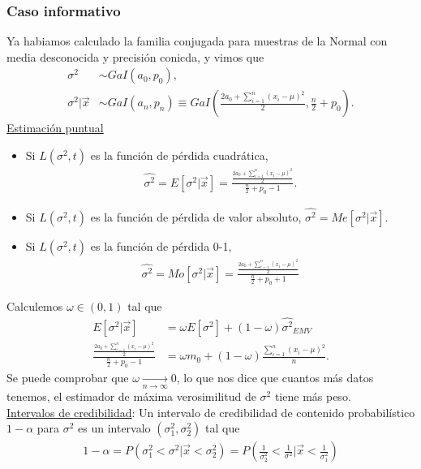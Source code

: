 \subsubsection{Caso informativo}
\noindent Ya habiamos calculado la familia conjugada para muestras de la Normal con media desconocida y precisión conicda, y vimos que
\begin{align*}
    \sigma^2 &\sim GaI(a_0,p_0), \\
    \sigma^2 | \vec{x} &\sim GaI(a_n,p_n) \equiv GaI\left(\frac{2a_0 + \sum_{i=1}^{n} (x_i- \mu)^2}{2}, \frac{n}{2} + p_0 \right).
\end{align*}
\noindent \underline{Estimación puntual}
\begin{itemize}
    \item Si $L(\sigma^2,t)$ es la función de pérdida cuadrática, 
    \begin{align*}
        \widehat{\sigma^2} = E[\sigma^2 |  \vec{x}] = \frac{\frac{2a_0 + \sum_{i=1}^{n} (x_i- \mu)^2}{2}}{\frac{n}{2} + p_0-1}.
    \end{align*}
    \item Si $L(\sigma^2,t)$ es la función de pérdida de valor absoluto, $\widehat{\sigma^2} = Me[\sigma^2 |  \vec{x}]$.
    \item Si $L(\sigma^2,t)$ es la función de pérdida 0-1,
    \begin{align*}
        \widehat{\sigma^2} = Mo[\sigma^2 |  \vec{x}] =  \frac{\frac{2a_0 + \sum_{i=1}^{n} (x_i- \mu)^2}{2}}{\frac{n}{2} + p_0+1}
    \end{align*}
\end{itemize}
Calculemos $\omega \in (0,1)$ tal que 
\begin{align*}
    E[\sigma^2  | \vec{x}] &= \omega E[\sigma^2]  + (1 - \omega) \widehat{\sigma^2 }_{EMV}  \\
   \frac{\frac{2a_0 + \sum_{i=1}^{n} (x_i- \mu)^2}{2}}{\frac{n}{2} + p_0-1} &= \omega m_0 + (1-\omega) \frac{\sum_{i=1}^{n}{(x_i -\mu)^2}}{n}.
\end{align*}
Se puede comprobar que $\omega \xrightarrow[n \to \infty]{} 0$, lo que nos dice que cuantos más datos tenemos, el estimador de máxima verosimilitud de $\sigma^2$ tiene más peso.
\\
\newline
\noindent \underline{Intervalos de credibilidad}: Un intervalo de credibilidad de contenido probabilístico $1-\alpha$ para $\sigma^2$ es un intervalo $(\sigma_1^2, \sigma_2^2)$ tal que
\begin{align*}
    1 - \alpha = P(\sigma_1^2 < \sigma^2 | \vec{x} < \sigma_2^2) = P\left( \frac{1}{\sigma_2^2} < \frac{1}{\sigma^2} |  \vec{x} < \frac{1}{\sigma_1^2} \right)
\end{align*}
